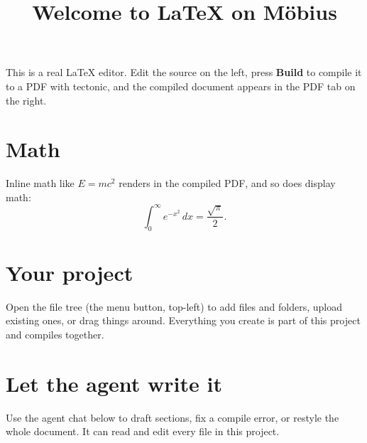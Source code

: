 \documentclass{article}
\title{Welcome to LaTeX on M\"obius}
\author{}
\date{}
\begin{document}
\maketitle

This is a real LaTeX editor. Edit the source on the left, press
\textbf{Build} to compile it to a PDF with tectonic, and the compiled
document appears in the PDF tab on the right.

\section{Math}

Inline math like $E = mc^2$ renders in the compiled PDF, and so does
display math:
\[
  \int_0^\infty e^{-x^2}\,dx = \frac{\sqrt{\pi}}{2}.
\]

\section{Your project}

Open the file tree (the menu button, top-left) to add files and folders,
upload existing ones, or drag things around. Everything you create is part
of this project and compiles together.

\section{Let the agent write it}

Use the agent chat below to draft sections, fix a compile error, or restyle
the whole document. It can read and edit every file in this project.
\end{document}
